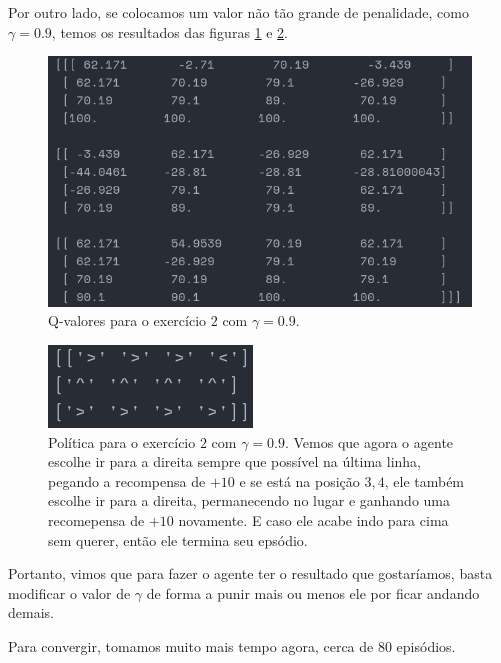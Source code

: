 \documentclass[12pt, a4paper, oneside]{article}
\begin{document}
Por outro lado, se colocamos um valor não tão grande de penalidade, como
$\gamma=0.9$, temos os resultados das figuras \ref{q-values-ex2.2.png} e
\ref{policy-ex2.2.png}.

\begin{figure}[h]
\centering
\includegraphics[scale=0.8]{Res/q-values-ex2.2.png}
\caption{Q-valores para o exercício $2$ com $\gamma=0.9$.}
\label{q-values-ex2.2.png}
\end{figure}

\begin{figure}[h]
\centering
\includegraphics[scale=0.8]{Res/policy-ex2.2.png}
\caption{Política para o exercício $2$ com $\gamma=0.9$. Vemos que agora o
agente escolhe ir para a direita sempre que possível na última linha, pegando a
recompensa de $+10$ e se está na posição $3,4$, ele também escolhe ir para a
direita, permanecendo no lugar e ganhando uma recomepensa de $+10$ novamente. E
caso ele acabe indo para cima sem querer, então ele termina seu epsódio.}
\label{policy-ex2.2.png}
\end{figure}

Portanto, vimos que para fazer o agente ter o resultado que gostaríamos, basta
modificar o valor de $\gamma$ de forma a punir mais ou menos ele por ficar
andando demais.

Para convergir, tomamos muito mais tempo agora, cerca de $80$ episódios.




\end{document}
